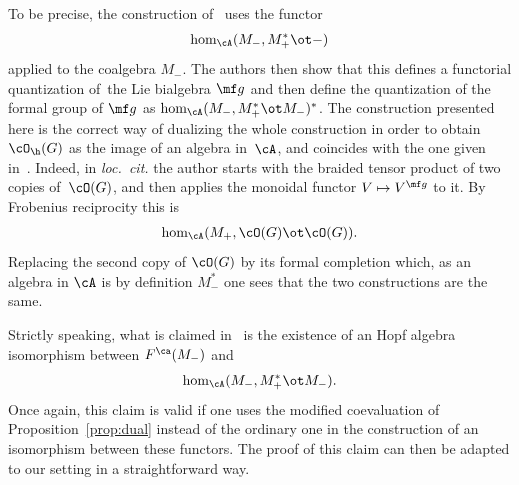 \begin{rmk}\label{rmk:EK}
	To be precise, the construction of~\cite{Etingof1996} uses the functor
\begin{gather*}
		\hom_\cA(M_-,M_+^*\ot -)
	\end{gather*} applied to the coalgebra $M_-$. The authors then show that this def\/ines a functorial quantization of~the Lie bialgebra $\mf g$ and then def\/ine the quantization of the formal group of $\mf g$ as $\hom_\cA(M_-,M_+^*\ot M_-)^*$. The construction presented here is the correct way of dualizing the whole construction in order to obtain $\cO_\h(G)$ as the image of an algebra in~$\cA$, and coincides with the one given in~\cite{Severa2016}. Indeed, in \emph{loc.\ cit.} the author starts with the braided tensor product of two copies of~$\cO(G)$, and then applies the monoidal functor $V\mapsto V^{\mf g}$ to it. By Frobenius reciprocity this is
	\begin{gather*}
		\hom_\cA(M_+,\cO(G)\ot \cO(G)).
	\end{gather*}
	Replacing the second copy of $\cO(G)$ by its formal completion which, as an algebra in $\cA$ is by def\/inition $M_-^*$ one sees that the two constructions are the same.
\end{rmk}
\begin{rmk}
	Strictly speaking, what is claimed in~\cite{Etingof1996} is the existence of an Hopf algebra isomorphism between $F^\ca(M_-)$ and
	\begin{gather*}
		\hom_\cA(M_-,M_+^*\ot M_-).
	\end{gather*}
	Once again, this claim is valid if one uses the modif\/ied coevaluation of Proposition~\ref{prop:dual} instead of the ordinary one in the construction of an isomorphism between these functors. The proof of this claim can then be adapted to our setting in a straightforward way.
\end{rmk}

